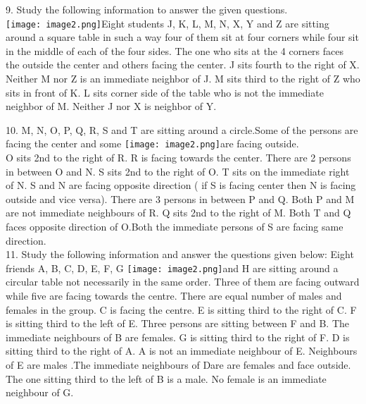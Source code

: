 \documentclass[
]{article}
\begin{document}
9. Study the following information to answer the given questions.\\
\texttt{[image: image2.png]}Eight students J, K, L, M, N, X, Y and Z are sitting around a square table in such a way four
of them sit at four corners while four sit in the middle of each of the four sides. The one who
sits at the 4 corners faces the outside the center and others facing the center. J sits fourth to
the right of X. Neither M nor Z is an immediate neighbor of J. M sits third to the right of Z
who sits in front of K. L sits corner side of the table who is not the immediate neighbor of M.
Neither J nor X is neighbor of Y.

10. M, N, O, P, Q, R, S and T are sitting around a circle.Some of the persons are facing the center
and some \texttt{[image: image2.png]}are facing outside.\\
O sits 2nd to the right of R. R is facing towards the center. There are 2 persons in between O
and N. S sits 2nd to the right of O. T sits on the immediate right of N. S and N are facing
opposite direction ( if S is facing center then N is facing outside and vice versa). There are 3
persons in between P and Q. Both P and M are not immediate neighbours of R. Q sits 2nd to
the right of M. Both T and Q faces opposite direction of O.Both the immediate persons of S
are facing same direction.\\

11. Study the following information and answer the questions given below: Eight friends A, B,
C, D, E, F, G \texttt{[image: image2.png]}and H are sitting around a circular table not necessarily in the same order.
Three of them are facing outward while five are facing towards the centre. There are equal
number of males and females in the group. C is facing the centre. E is sitting third to the
right of C. F is sitting third to the left of E. Three persons are sitting between F and B. The immediate neighbours of B are females. G is sitting third to the right of F. D is sitting third
to the right of A. A is not an immediate neighbour of E. Neighbours of E are males .The
immediate neighbours of Dare are females and face outside. The one sitting third to the left
of B is a male. No female is an immediate neighbour of G.\\
\end{document}
